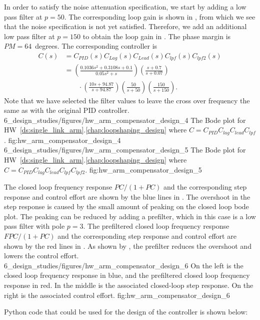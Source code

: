 In order to satisfy the noise attenuation specification, we start by adding a low pass filter at $p=50$.  The corresponding loop gain is shown in , from which we see that the noise specification is not yet satisfied.  Therefore, we add an additional low pass filter at $p=150$ to obtain the loop gain in .  The phase margin is $PM=64$~degrees. The corresponding controller is
\begin{align*}
C(s) &= C_{PID}(s)C_{Lag}(s)C_{Lead}(s)C_{lpf}(s)C_{lpf2}(s) \\
     &=  \left(\frac{0.1036 s^2 + 0.3108 s + 0.1}{0.05 s^2 + s}\right)\left(\frac{s + 0.7}{s + 0.07}\right)
     \\ &\qquad\cdot
	\left(\frac{10 s + 94.87}{s + 94.87}\right)\left(\frac{50}{s+50}\right)\left(\frac{150}{s+150}\right).
\end{align*}
Note that we have selected the filter values to leave the cross over frequency the same as with the original PID controller.
	{6_design_studies/figures/hw_arm_compensator_design_4}
	{The Bode plot for HW~\ref{ds:single_link_arm}.\ref{chap:loopshaping_design} where $C=C_{PID}C_{lag}C_{lead}C_{lpf}$.}
	{fig:hw_arm_compensator_design_4}
	{6_design_studies/figures/hw_arm_compensator_design_5}
	{The Bode plot for HW~\ref{ds:single_link_arm}.\ref{chap:loopshaping_design} where $C=C_{PID}C_{lag}C_{lead}C_{lpf}C_{lpf2}$.}
	{fig:hw_arm_compensator_design_5}

The closed loop frequency response $PC/(1+PC)$ and the corresponding step response and control effort are shown by the blue lines in .  The overshoot in the step response is caused by the small amount of peaking on the closed loop bode plot.  The peaking can be reduced by adding a prefilter, which in this case is a low pass filter with pole $p=3$.   The prefiltered closed loop frequency response $FPC/(1+PC)$ and the corresponding step response and control effort are shown by the red lines in .  As shown by , the prefilter reduces the overshoot and lowers the control effort.
	{6_design_studies/figures/hw_arm_compensator_design_6}
	{On the left is the closed loop frequency response in blue, and the prefiltered closed loop frequency response in red.  In the middle is the associated closed-loop step response.  On the right is the associated control effort.}
	{fig:hw_arm_compensator_design_6}


Python code that could be used for the design of the controller is shown below:


%
%


